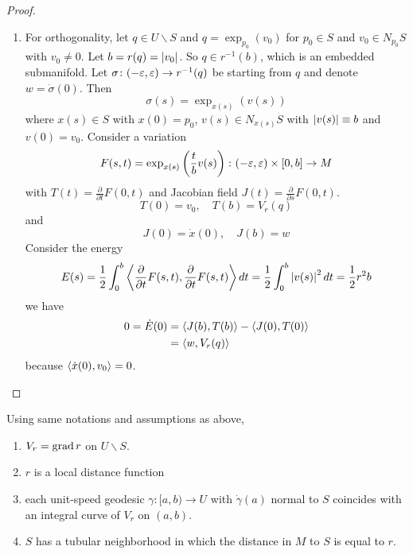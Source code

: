 \begin{enumerate}[label=\arabic{*}.]
\begin{proof}
\begin{enumerate}[label=(\roman*)]
	 	    \item  For orthogonality, let $q \in U \backslash S$ and $q = \exp_{p_0}(v_0)$ for $p_0 \in S$ and $v_0 \in N_{p_0}S$ with $v_0 \neq 0$. Let $b = r(q) = \left\lvert v_0\right\lvert$. So $q \in r^{-1}(b)$, which is an embedded submanifold. Let $\sigma \colon (-\varepsilon,\varepsilon) \rightarrow r^{-1}(q)$ be starting from $q$ and denote $w = \dot{\sigma}(0)$. Then
	 	    \begin{equation*}
	 	        \sigma(s) = \exp_{x(s)}(v(s))
	 	    \end{equation*}
	 	    where $x(s) \in S$ with $x(0) = p_0$, $v(s) \in N_{x(s)}S$ with $\left\lvert v(s)\right\lvert \equiv b$ and $v(0)=v_0$. Consider a variation
	 	    \begin{equation*}
	 	        F(s,t) = \exp_{x(s)}\left(\frac{t}{b}v(s)\right) \colon (-\varepsilon,\varepsilon) \times [0,b] \rightarrow M
	 	    \end{equation*}
	 	    with $T(t) = \frac{\partial}{\partial t}F(0,t)$ and Jacobian field $J(t) = \frac{\partial}{\partial s}F(0,t)$.
	 	    \begin{equation*}
	 	        T(0) = v_0,\quad T(b) = V_r(q)
	 	    \end{equation*}
	 	    and
	 	    \begin{equation*}
	 	        J(0) = \dot{x}(0),\quad J(b) = w
	 	    \end{equation*}
	 	    Consider the energy
	 	    \begin{equation*}
	 	        E(s) = \frac{1}{2} \int_0^b \left\langle \frac{\partial}{\partial t}F(s,t),\frac{\partial}{\partial t}F(s,t) \right\rangle dt = \frac{1}{2} \int_0^b \left\lvert v(s)\right\lvert^2dt = \frac{1}{2}r^2b
	 	    \end{equation*}
	 	    we have
	 	    \begin{equation*}
	 	        \begin{aligned}
	 	            0 = \dot{E}(0) &= \left\langle J(b),T(b) \right\rangle - \left\langle J(0),T(0) \right\rangle \\
	 	            &= \left\langle w,V_r(q) \right\rangle
	 	        \end{aligned}
	 	    \end{equation*}
	 	    because $\left\langle \dot{x}(0),v_0 \right\rangle = 0$. \qedhere
 		\end{enumerate}
 	\end{proof}
 	\begin{cor}
 	    Using same notations and assumptions as above,
 	    \begin{enumerate}[label=(\arabic{*})]
 	    	\item $V_r = \operatorname{grad} r$ on $U \backslash S$.
 	    	\item $r$ is a local distance function
 	    	\item  each unit-speed geodesic $\gamma:[a, b) \rightarrow U$ with $\dot{\gamma}(a)$ normal to $S$ coincides with an integral curve of $V_r$ on $(a, b)$.
			\item  $S$ has a tubular neighborhood in which the distance in $M$ to $S$ is equal to $r$.
 	    \end{enumerate}
 	\end{cor}
\end{enumerate}

